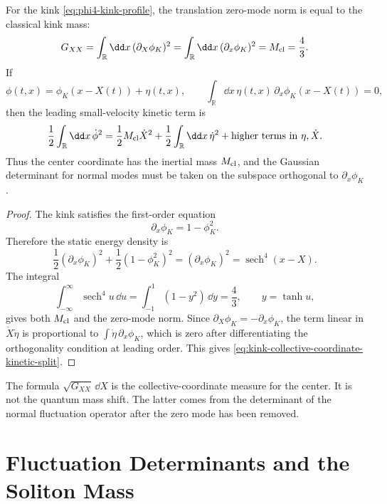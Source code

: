 \begin{proposition}
\label{prop:kink-center-collective-coordinate}
For the kink \eqref{eq:phi4-kink-profile}, the translation zero-mode norm is
equal to the classical kink mass:
\begin{equation}
  G_{XX}
  =
  \int_{\mathbb R}\dd x\,(\partial_X\phi_K)^2
  =
  \int_{\mathbb R}\dd x\,(\partial_x\phi_K)^2
  =
  M_{\rm cl}
  =
  \frac43 .
  \label{eq:kink-center-collective-metric}
\end{equation}
If
\[
  \phi(t,x)=\phi_K(x-X(t))+\eta(t,x),
  \qquad
  \int_{\mathbb R}\dd x\,\eta(t,x)\,\partial_x\phi_K(x-X(t))=0 ,
\]
then the leading small-velocity kinetic term is
\begin{equation}
  \frac12\int_{\mathbb R}\dd x\,\dot\phi^2
  =
  \frac12M_{\rm cl}\dot X^2
  +
  \frac12\int_{\mathbb R}\dd x\,\dot\eta^2
  +\hbox{higher terms in }\eta,\dot X .
  \label{eq:kink-collective-coordinate-kinetic-split}
\end{equation}
Thus the center coordinate has the inertial mass \(M_{\rm cl}\), and the
Gaussian determinant for normal modes must be taken on the subspace
orthogonal to \(\partial_x\phi_K\).
\end{proposition}

\begin{proof}
The kink satisfies the first-order equation
\[
  \partial_x\phi_K=1-\phi_K^2.
\]
Therefore the static energy density is
\[
  \frac12(\partial_x\phi_K)^2+\frac12(1-\phi_K^2)^2
  =
  (\partial_x\phi_K)^2
  =
  \operatorname{sech}^4(x-X).
\]
The integral
\[
  \int_{-\infty}^{\infty}\operatorname{sech}^4 u\,\dd u
  =
  \int_{-1}^{1}(1-y^2)\,\dd y
  =
  \frac43,
  \qquad y=\tanh u ,
\]
gives both \(M_{\rm cl}\) and the zero-mode norm.  Since
\(\partial_X\phi_K=-\partial_x\phi_K\), the term linear in
\(\dot X\dot\eta\) is proportional to
\(\int\dot\eta\,\partial_x\phi_K\), which is zero after differentiating the
orthogonality condition at leading order.  This gives
\eqref{eq:kink-collective-coordinate-kinetic-split}.
\end{proof}

The formula \(\sqrt{G_{XX}}\,\dd X\) is the collective-coordinate measure for
the center.  It is not the quantum mass shift.  The latter comes from the
determinant of the normal fluctuation operator after the zero mode has been
removed.

\section{Fluctuation Determinants and the Soliton Mass}
\label{sec:soliton-fluctuation-determinants-mass}


